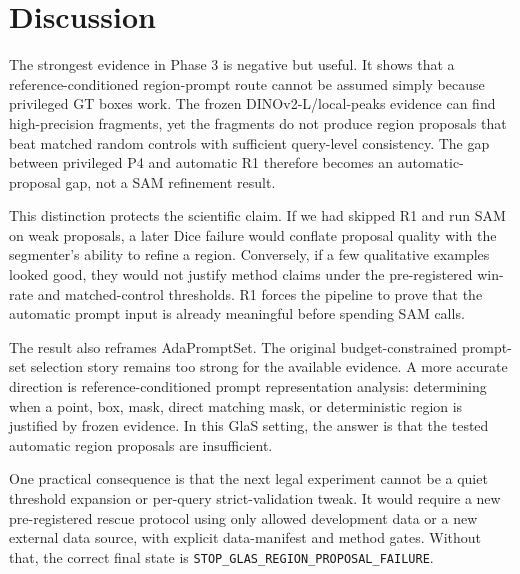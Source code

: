 \section{Discussion}

The strongest evidence in Phase 3 is negative but useful. It shows that a reference-conditioned region-prompt route cannot be assumed simply because privileged GT boxes work. The frozen DINOv2-L/local-peaks evidence can find high-precision fragments, yet the fragments do not produce region proposals that beat matched random controls with sufficient query-level consistency. The gap between privileged P4 and automatic R1 therefore becomes an automatic-proposal gap, not a SAM refinement result.

This distinction protects the scientific claim. If we had skipped R1 and run SAM on weak proposals, a later Dice failure would conflate proposal quality with the segmenter's ability to refine a region. Conversely, if a few qualitative examples looked good, they would not justify method claims under the pre-registered win-rate and matched-control thresholds. R1 forces the pipeline to prove that the automatic prompt input is already meaningful before spending SAM calls.

The result also reframes AdaPromptSet. The original budget-constrained prompt-set selection story remains too strong for the available evidence. A more accurate direction is reference-conditioned prompt representation analysis: determining when a point, box, mask, direct matching mask, or deterministic region is justified by frozen evidence. In this GlaS setting, the answer is that the tested automatic region proposals are insufficient.

One practical consequence is that the next legal experiment cannot be a quiet threshold expansion or per-query strict-validation tweak. It would require a new pre-registered rescue protocol using only allowed development data or a new external data source, with explicit data-manifest and method gates. Without that, the correct final state is \texttt{STOP\_GLAS\_REGION\_PROPOSAL\_FAILURE}.
